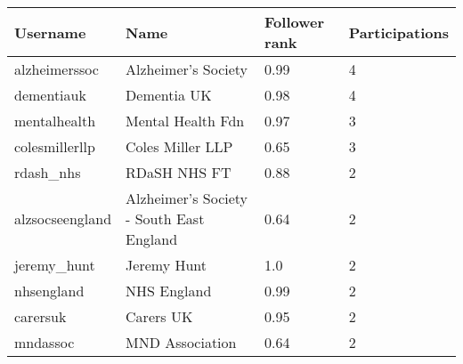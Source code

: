 \begin{tabularx}{\textwidth}{|X|X|X|X|}
\hline
\textbf{Username} & \textbf{Name} & \textbf{Follower rank} & \textbf{Participations} \\ \hline
alzheimerssoc & Alzheimer's Society & 0.99 & 4 \\ \hline
dementiauk & Dementia UK & 0.98 & 4 \\ \hline
mentalhealth & Mental Health Fdn & 0.97 & 3 \\ \hline
colesmillerllp & Coles Miller LLP & 0.65 & 3 \\ \hline
rdash\_nhs & RDaSH NHS FT & 0.88 & 2 \\ \hline
alzsocseengland & Alzheimer's Society - South East England & 0.64 & 2 \\ \hline
jeremy\_hunt & Jeremy Hunt & 1.0 & 2 \\ \hline
nhsengland & NHS England & 0.99 & 2 \\ \hline
carersuk & Carers UK & 0.95 & 2 \\ \hline
mndassoc & MND Association & 0.64 & 2 \\ \hline
\end{tabularx}
